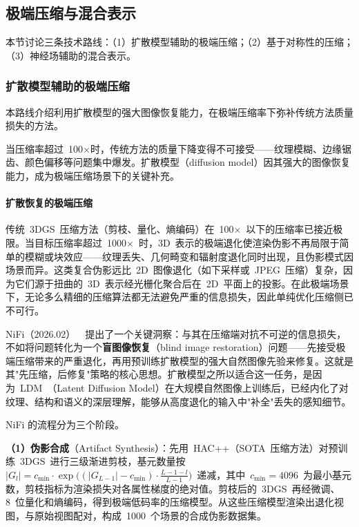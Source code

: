 \subsection{极端压缩与混合表示}
\label{ss:11_6a}

本节讨论三条技术路线：（1）扩散模型辅助的极端压缩；（2）基于对称性的压缩；（3）神经场辅助的混合表示。

\subsubsection{扩散模型辅助的极端压缩}

本路线介绍利用扩散模型的强大图像恢复能力，在极端压缩率下弥补传统方法质量损失的方法。

当压缩率超过~100$\times$时，传统方法的质量下降变得不可接受——纹理模糊、边缘锯齿、颜色偏移等问题集中爆发。扩散模型（diffusion model）因其强大的图像恢复能力，成为极端压缩场景下的关键补充。

\paragraph{扩散恢复的极端压缩}

传统~3DGS~压缩方法（剪枝、量化、熵编码）在~100$\times$~以下的压缩率已接近极限。当目标压缩率超过~1000$\times$~时，3D~表示的极端退化使渲染伪影不再局限于简单的模糊或块效应——纹理丢失、几何畸变和辐射度退化同时出现，且伪影模式因场景而异。这类复合伪影远比~2D~图像退化（如下采样或~JPEG~压缩）复杂，因为它们源于扭曲的~3D~表示经光栅化聚合后在~2D~平面上的投影。在此极端场景下，无论多么精细的压缩算法都无法避免严重的信息损失，因此单纯优化压缩侧已不可行。

NiFi（2026.02）~\cite{2602_04549}~提出了一个关键洞察：与其在压缩端对抗不可逆的信息损失，不如将问题转化为一个\textbf{盲图像恢复}（blind image restoration）问题——先接受极端压缩带来的严重退化，再用预训练扩散模型的强大自然图像先验来修复。这就是其"先压缩，后修复"策略的核心思想。扩散模型之所以适合这一任务，是因为~LDM~（Latent Diffusion Model）在大规模自然图像上训练后，已经内化了对纹理、结构和语义的深层理解，能够从高度退化的输入中"补全"丢失的感知细节。

NiFi 的流程分为三个阶段。

\textbf{（1）伪影合成}（Artifact Synthesis）：先用~HAC++（SOTA~压缩方法）对预训练~3DGS~进行三级渐进剪枝，基元数量按~$|G_l| = c_{\min} \cdot \exp\!\bigl((|G_{L-1}| - c_{\min}) \cdot \tfrac{L-1-l}{L-1}\bigr)$~递减，其中~$c_{\min}=4096$~为最小基元数，剪枝指标为渲染损失对各属性梯度的绝对值。剪枝后的~3DGS~再经微调、8~位量化和熵编码，得到极端低码率的压缩模型。从这些压缩模型渲染出退化视图，与原始视图配对，构成~1000~个场景的合成伪影数据集。

